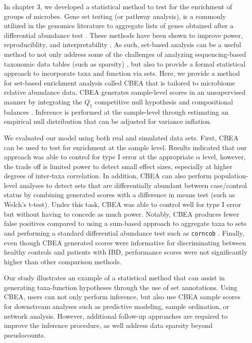 In chapter 3, we developed a statistical method to test for the enrichment of groups of microbes. Gene set testing (or pathway analysis), is a commonly utilized in the genomics literature to aggregate lists of genes obtained after a differential abundance test \cite{irizarry2009gene, goeman2007analyzing}. These methods have been shown to improve power, reproduciblity, and interpretability \cite{khatri2012ten}. As such, set-based analysis can be a useful method to not only address some of the challenges of analyzing sequencing-based taxonomic data tables (such as sparsity) \cite{li2015microbiome}, but also to provide a formal statistical approach to incorporate taxa and function via sets. Here, we provide a method for set-based enrichment analysis called CBEA that is tailored to microbiome relative abundance data. CBEA generates sample-level scores in an unsupervised manner by integrating the $Q_1$ competitive null hypothesis \cite{tian2005discovering} and compositional balances \cite{silverman2017phylogenetic, egozcue2003isometric}. Inference is performed at the sample-level through estimating an empirical null distribution that can be adjusted for variance inflation. 

We evaluated our model using both real and simulated data sets. First, CBEA can be used to test for enrichment at the sample level. Results indicated that our approach was able to control for type I error at the appropriate $\alpha$ level, however, the trade off is limited power to detect small effect sizes, especially at higher degrees of inter-taxa correlation. In addition, CBEA can also perform population-level analyses to detect sets that are differentially abundant between case/control status by combining generated scores with a difference in means test (such as Welch's t-test). Under this task, CBEA was able to control well for type I error but without having to concede as much power. Notably, CBEA produces fewer false positives compared to using a sum-based approach to aggregate taxa to sets and performing a standard differential abundance test such as \texttt{corncob} \cite{martin2020modeling}. Finally, even though CBEA generated scores were informative for discriminating between healthy controls and patients with IBD, performance scores were not significantly higher than other comparison methods.  

Our study illustrates an example of a statistical method that can assist in generating taxa-function hypotheses through the use of set annotations. Using CBEA, users can not only perform inference, but also use CBEA sample scores for downstream analyses such as predictive modeling, sample ordination, or network analysis. However, additional follow-up approaches are required to improve the inference procedure, as well address data sparsity beyond pseudocounts. 

